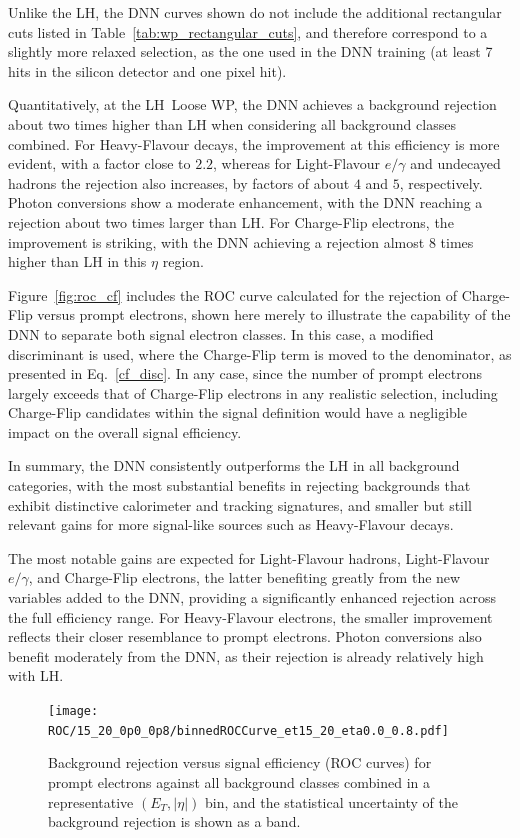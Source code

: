 Unlike the LH, the DNN curves shown do not include the additional rectangular cuts listed in Table~\ref{tab:wp_rectangular_cuts}, and therefore correspond to a slightly more relaxed selection, as the one used in the DNN training (at least 7 hits in the silicon detector and one pixel hit).

Quantitatively, at the LH~Loose WP, the DNN achieves a background rejection about two times higher than LH when considering all background classes combined. For Heavy-Flavour decays, the improvement at this efficiency is more evident, with a factor close to $2.2$, whereas for Light-Flavour $e/\gamma$ and undecayed hadrons the rejection also increases, by factors of about $4$ and $5$, respectively. Photon conversions show a moderate enhancement, with the DNN reaching a rejection about two times larger than LH. For Charge-Flip electrons, the improvement is striking, with the DNN achieving a rejection almost $8$ times higher than LH in this $\eta$ region.

Figure~\ref{fig:roc_cf} includes the ROC curve calculated for the rejection of Charge-Flip versus prompt electrons, shown here merely to illustrate the capability of the DNN to separate both signal electron classes. In this case, a modified discriminant is used, where the Charge-Flip term is moved to the denominator, as presented in Eq.~\ref{cf_disc}. In any case, since the number of prompt electrons largely exceeds that of Charge-Flip electrons in any realistic selection, including Charge-Flip candidates within the signal definition would have a negligible impact on the overall signal efficiency.

In summary, the DNN consistently outperforms the LH in all background categories, with the most substantial benefits in rejecting backgrounds that exhibit distinctive calorimeter and tracking signatures, and smaller but still relevant gains for more signal-like sources such as Heavy-Flavour decays.

The most notable gains are expected for Light-Flavour hadrons, Light-Flavour $e/\gamma$, and Charge-Flip electrons, the latter benefiting greatly from the new variables added to the DNN, providing a significantly enhanced rejection across the full efficiency range. For Heavy-Flavour electrons, the smaller improvement reflects their closer resemblance to prompt electrons. Photon conversions also benefit moderately from the DNN, as their rejection is already relatively high with LH.


\begin{figure}[htbp]
  \centering
  \texttt{[image: ROC/15\_20\_0p0\_0p8/binnedROCCurve\_et15\_20\_eta0.0\_0.8.pdf]}
  \caption{Background rejection versus signal efficiency (ROC curves) for prompt electrons against all background classes combined in a representative $(E_{T}, |\eta|)$ bin, and the statistical uncertainty of the background rejection is shown as a band.}
  \label{fig:roc_allblkg}
\end{figure}

